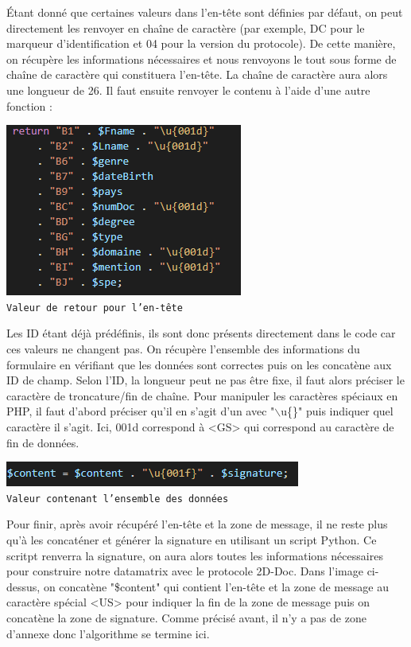 Étant donné que certaines valeurs dans l'en-tête sont définies par défaut, on peut directement les renvoyer en chaîne de caractère (par exemple, DC pour le marqueur d'identification et 04 pour la version du protocole). De cette manière, on récupère les informations nécessaires et nous renvoyons le tout sous forme de chaîne de caractère qui constituera l'en-tête. La chaîne de caractère aura alors une longueur de 26. Il faut ensuite renvoyer le contenu à l'aide d'une autre fonction : 

\begin{center}
    \includegraphics[scale=0.60]{imgs/Capture3.PNG}\\
    \texttt{Valeur de retour pour l'en-tête}
\end{center}

Les ID étant déjà prédéfinis, ils sont donc présents directement dans le code car ces valeurs ne changent pas. On récupère l'ensemble des informations du formulaire en vérifiant que les données sont correctes puis on les concatène aux ID de champ. Selon l'ID, la longueur peut ne pas être fixe, il faut alors préciser le caractère de troncature/fin de chaîne. Pour manipuler les caractères spéciaux en PHP, il faut d'abord préciser qu'il en s'agit d'un avec "$\backslash$u\{\}" puis indiquer quel caractère il s'agit. Ici, 001d correspond à <GS> qui correspond au caractère de fin de données.

\begin{center}
    \includegraphics[scale=0.60]{imgs/Capture4.PNG}\\
    \texttt{Valeur contenant l'ensemble des données}
\end{center}

Pour finir, après avoir récupéré l'en-tête et la zone de message, il ne reste plus qu'à les concaténer et générer la signature en utilisant un script Python. Ce scritpt renverra la signature, on aura alors toutes les informations nécessaires pour construire notre datamatrix avec le protocole 2D-Doc. Dans l'image ci-dessus, on concatène "\$content" qui contient l'en-tête et la zone de message au caractère spécial <US> pour indiquer la fin de la zone de message puis on concatène la zone de signature. Comme précisé avant, il n'y a pas de zone d'annexe donc l'algorithme se termine ici.